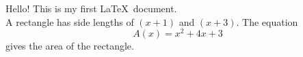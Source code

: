 \documentclass[11pt]{article}
\begin{document}
Hello! This is my first \LaTeX\ document.\\

A rectangle has side lengths of $(x+1)$ and $(x+3)$. 
The equation $${A(x)=x^2+4x+3}$$ gives the area of the rectangle.
\end{document}
